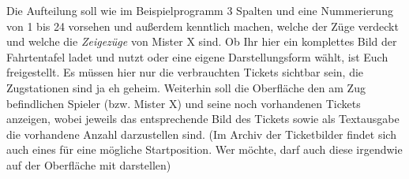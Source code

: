         Die Aufteilung soll wie im Beispielprogramm 3 Spalten und eine Nummerierung von 1 bis 24 vorsehen und außerdem kenntlich machen, welche der Züge verdeckt und welche die \textit{Zeigezüge} von Mister X sind.
        Ob Ihr hier ein komplettes Bild der Fahrtentafel ladet und nutzt oder eine eigene Darstellungsform wählt, ist Euch freigestellt.
        Es müssen hier nur die verbrauchten Tickets sichtbar sein, die Zugstationen sind ja eh geheim.
        \newline
        \newline
        Weiterhin soll die Oberfläche den am Zug befindlichen Spieler (bzw. Mister X) und seine noch vorhandenen Tickets anzeigen, wobei jeweils das entsprechende Bild des Tickets sowie als Textausgabe die vorhandene Anzahl darzustellen sind.
        (Im Archiv der Ticketbilder findet sich auch eines für eine mögliche Startposition.
        Wer möchte, darf auch diese irgendwie auf der Oberfläche mit darstellen)

